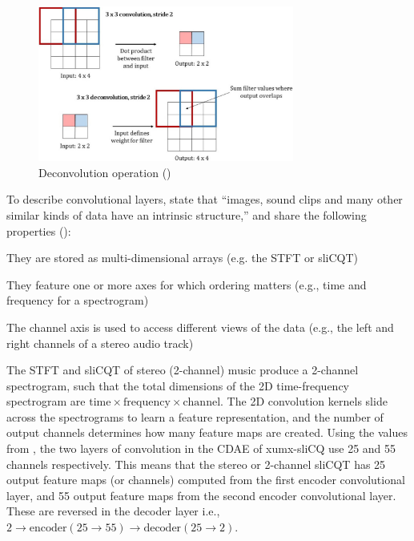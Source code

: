 \documentclass[report.tex]{subfiles}
\begin{document}
\begin{figure}[ht]
	\centering
	\includegraphics[width=0.75\textwidth]{./images-neural/convtranspose.png}
	\caption{Deconvolution operation (\cite[11]{convtranspose})}
	\label{fig:convtranspose}
\end{figure}

To describe convolutional layers, \citeauthor{convguide} state that ``images, sound clips and many other similar kinds of data have an intrinsic structure,'' and share the following properties (\cite[6]{convguide}):

\begin{tight_enumerate}
	\item
		They are stored as multi-dimensional arrays (e.g. the STFT or sliCQT)
	\item
		They feature one or more axes for which ordering matters (e.g., time and frequency for a spectrogram)
	\item
		The channel axis is used to access different views of the data (e.g., the left and right channels of a stereo audio track)
\end{tight_enumerate}

The STFT and sliCQT of stereo (2-channel) music produce a 2-channel spectrogram, such that the total dimensions of the 2D time-frequency spectrogram are $\text{time} \times \text{frequency} \times \text{channel}$. The 2D convolution kernels slide across the spectrograms to learn a feature representation, and the number of output channels determines how many feature maps are created. Using the values from \textcite{plumbley2}, the two layers of convolution in the CDAE of xumx-sliCQ use 25 and 55 channels respectively. This means that the stereo or 2-channel sliCQT has 25 output feature maps (or channels) computed from the first encoder convolutional layer, and 55 output feature maps from the second encoder convolutional layer. These are reversed in the decoder layer i.e., $2 \rightarrow \text{encoder}(25 \rightarrow 55) \rightarrow \text{decoder}(25 \rightarrow 2)$.
\end{document}
